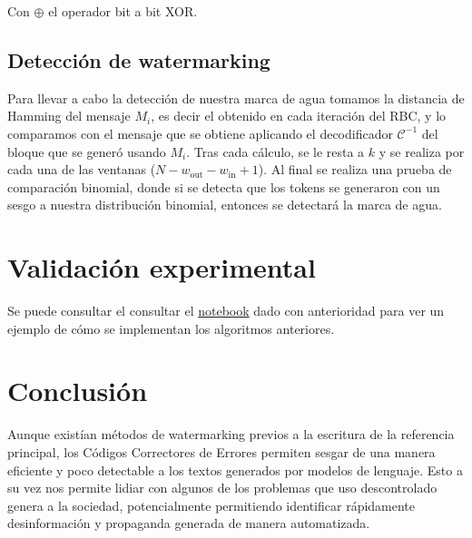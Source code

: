\documentclass[a4paper,11pt]{article}
\begin{document}
Con $\oplus$ el operador bit a bit XOR.

\subsection{Detección de watermarking}
Para llevar a cabo la detección de nuestra marca de agua tomamos la distancia de Hamming del mensaje $M_i$, es decir el obtenido en cada iteración del RBC, y lo comparamos con el mensaje que se obtiene aplicando el decodificador $\mathcal C^{-1}$ del bloque que se generó usando $M_i$. Tras cada cálculo, se le resta a $k$ y se realiza por cada una de las ventanas ($N-w_{\textrm{out}}-w_{\textrm{in}}+1$). Al final se realiza una prueba de comparación binomial, donde si se detecta que los tokens se generaron con un sesgo a nuestra distribución binomial, entonces se detectará la marca de agua.
\section{Validación experimental}
Se puede consultar el consultar el \href{https://colab.research.google.com/drive/1GlNBf0DbZTonpNINr_cJQ9VolosbFdR4?usp=sharing}{notebook} dado con anterioridad para ver un ejemplo de cómo se implementan los algoritmos anteriores.
\section{Conclusión}
Aunque existían métodos de watermarking previos a la escritura de la referencia principal, los Códigos Correctores de Errores permiten sesgar de una manera eficiente y poco detectable a los textos generados por modelos de lenguaje. Esto a su vez nos permite lidiar con algunos de los problemas que uso descontrolado genera a la sociedad, potencialmente permitiendo identificar rápidamente desinformación y propaganda generada de manera automatizada.
\nocite{*}
\printbibliography
\end{document}
